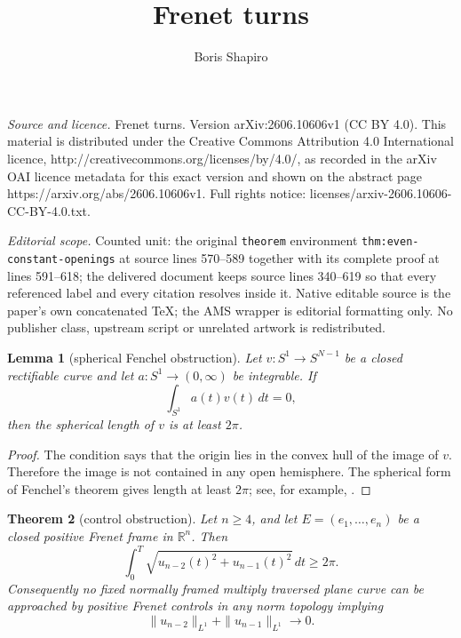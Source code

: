 \documentclass[10pt,a4paper]{amsart}
\newtheorem{theorem}{Theorem}[section]
\newtheorem{lemma}[theorem]{Lemma}
\newcommand{\R}{\mathbb R}
\begin{document}
\title[Frenet turns]{Frenet turns}
\author{Boris Shapiro}
\date{}
\maketitle
\noindent\emph{Source and licence.} Frenet turns. Version arXiv:2606.10606v1 (CC BY 4.0). This material is distributed under the Creative Commons Attribution 4.0 International licence, http://creativecommons.org/licenses/by/4.0/, as recorded in the arXiv OAI licence metadata for this exact version and shown on the abstract page https://arxiv.org/abs/2606.10606v1. Full rights notice: licenses/arxiv-2606.10606-CC-BY-4.0.txt.\par\smallskip
\noindent\textit{Editorial scope.} Counted unit: the original \texttt{theorem} environment \texttt{thm:even-constant-openings} at source lines 570--589 together with its complete proof at lines 591--618; the delivered document keeps source lines 340--619 so that every referenced label and every citation resolves inside it. Native editable source is the paper's own concatenated TeX; the AMS wrapper is editorial formatting only. No publisher class, upstream script or unrelated artwork is redistributed.
\begin{lemma}[spherical Fenchel obstruction]\label{lem:spherical-obstruction}
Let $v:S^1\to S^{N-1}$ be a closed rectifiable curve and let $a:S^1\to(0,\infty)$
be integrable.  If
\[
        \int_{S^1}a(t)v(t)\,dt=0,
\]
then the spherical length of $v$ is at least $2\pi$.
\end{lemma}

\begin{proof}
The condition says that the origin lies in the convex hull of the image of $v$.
Therefore the image is not contained in any open hemisphere.  The spherical form of
Fenchel's theorem gives length at least $2\pi$; see, for example,
\cite{Fenchel,Milnor}.
\end{proof}

\begin{theorem}[control obstruction]\label{thm:strong-control-obstruction}
Let $n\ge4$, and let $E=(e_1,\ldots,e_n)$ be a closed positive Frenet frame in
$\R^n$.  Then
\begin{equation}\label{eq:last-bound}
        \int_0^T\sqrt{u_{n-2}(t)^2+u_{n-1}(t)^2}\,dt\ge2\pi .
\end{equation}
Consequently no fixed normally framed multiply traversed plane curve can be
approached by positive Frenet controls in any norm topology implying
\[
        \|u_{n-2}\|_{L^1}+\|u_{n-1}\|_{L^1}\longrightarrow0.
\]
\end{theorem}
\end{document}
